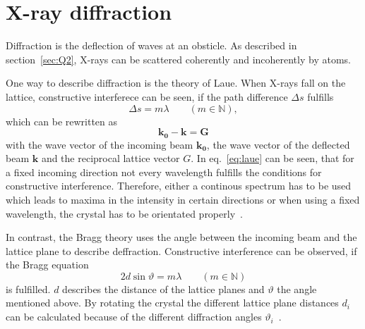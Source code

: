 
\section{X-ray diffraction}\label{sec:Q5}

Diffraction is the deflection of waves at an obsticle. As described in section~\ref{sec:Q2}, X-rays can be scattered coherently and incoherently by atoms. \par 
One way to describe diffraction is the theory of Laue. When X-rays fall on the lattice, constructive interferece can be seen, if the path difference $\Delta s$ fulfills 
\begin{equation}
    \Delta s = m\lambda \qquad (m \in \mathbb{N}),
\end{equation}
which can be rewritten as 
\begin{equation}
    \mathbf{k_0} - \mathbf{k} = \mathbf{G}
    \label{eq:laue}
\end{equation}
with the wave vector of the incoming beam $\mathbf{k_0}$, the wave vector of the deflected beam $\mathbf{k}$ and the reciprocal lattice vector $G$. In eq.~\ref{eq:laue} can be seen, that for a fixed incoming direction not every wavelength fulfills the conditions for constructive interference. Therefore, either a continous spectrum has to be used which leads to maxima in the intensity in certain directions or when using a fixed wavelength, the crystal has to be orientated properly~\cite{Demtroeder.2016}. \par 
In contrast, the Bragg theory uses the angle between the incoming beam and the lattice plane to describe deffraction. Constructive interference can be observed, if the Bragg equation 
\begin{equation}
    2d\sin\vartheta = m\lambda \qquad (m \in \mathbb{N})
\end{equation}
is fulfilled. $d$ describes the distance of the lattice planes and $\vartheta$ the angle mentioned above. By rotating the crystal the different lattice plane distances $d_i$ can be calculated because of the different diffraction angles $\vartheta_i$~\cite{Demtroeder.2016}.
